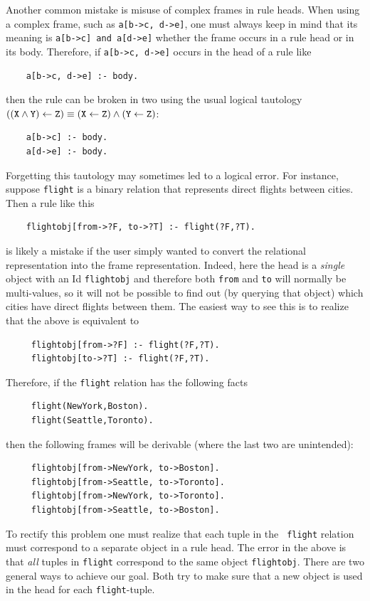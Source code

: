 \documentclass[11pt]{article}
\begin{document}
Another common mistake is misuse of complex frames in
rule heads. When using a complex frame, such as {\tt a[b->c, d->e]},
one must always keep in mind that  its meaning is {\tt a[b->c] and a[d->e]}
whether the frame occurs in a rule head or in its body. Therefore, if
{\tt a[b->c, d->e]} occurs in the head of a rule like
\begin{verbatim}
    a[b->c, d->e] :- body.  
\end{verbatim}
then the rule can be broken in two using the usual logical tautology 
{\smaller$\tt ((X\wedge Y)\leftarrow Z) \equiv (X\leftarrow
  Z)\wedge(Y\leftarrow Z)$}:
\begin{verbatim}
    a[b->c] :- body.
    a[d->e] :- body.
\end{verbatim}
Forgetting this tautology may sometimes led to a logical error.
For instance, suppose {\tt flight} is a binary relation that represents
direct flights between cities. Then a rule like this
\begin{verbatim}
    flightobj[from->?F, to->?T] :- flight(?F,?T).  
\end{verbatim}
is likely a mistake if the user simply wanted to convert the
relational representation into the frame representation. Indeed,
here the head
is a \emph{single} object with an Id \texttt{flightobj} and therefore both {\tt from} and
{\tt to} will normally be multi-values, so it will not be possible to find out
(by querying that object) which cities have direct flights between them.
The easiest way to see this is to realize that the above is equivalent to
\begin{verbatim}
     flightobj[from->?F] :- flight(?F,?T).
     flightobj[to->?T] :- flight(?F,?T).
\end{verbatim}
Therefore, if the {\tt flight} relation has the following facts
\begin{verbatim}
     flight(NewYork,Boston).  
     flight(Seattle,Toronto).  
\end{verbatim}
then the following frames will be derivable (where the last two are
unintended):
\begin{verbatim}
     flightobj[from->NewYork, to->Boston].  
     flightobj[from->Seattle, to->Toronto].  
     flightobj[from->NewYork, to->Toronto].  
     flightobj[from->Seattle, to->Boston].  
\end{verbatim}
To rectify this problem one must realize that each tuple in the {\tt
  flight} relation must correspond to a separate object in a rule head.
The error in the above is that \emph{all} tuples in {\tt flight}
correspond to the same object {\tt flightobj}.  There are two general ways
to achieve our goal. Both try to make sure that a new object is used in
the head for each {\tt flight}-tuple.
\end{document}
